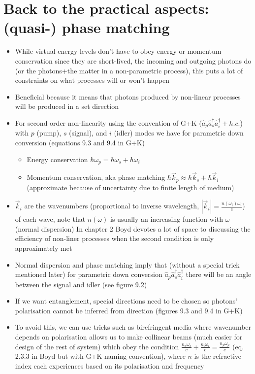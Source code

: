 \documentclass[english]{article}
\begin{document}
\section{Back to the practical aspects: (quasi-) phase matching}
\begin{itemize}
\item While virtual energy levels don't have to obey energy or momentum conservation since they are short-lived, the incoming and outgoing photons do (or the photons+the matter in a non-parametric process), this puts a lot of constraints on what processes will or won't happen
\item Beneficial because it means that photons produced by non-linear processes will be produced in a set direction
\item For second order non-linearity using the convention of G+K ($\hat{a}_p\hat{a}^\dagger_s\hat{a}^\dagger_i+h.c.$) with $p$ (pump), $s$ (signal), and $i$ (idler) modes we have for parametric down conversion (equations 9.3 and 9.4 in G+K)
\begin{itemize}
\item Energy conservation $\hbar \omega_p=\hbar \omega_s+\hbar \omega_i$
\item Momentum conservation, aka phase matching $\hbar \vec{k}_p\approx \hbar \vec{k}_s+\hbar \vec{k}_i$ (approximate because of uncertainty due to finite length of medium)
\end{itemize}
\item  $\vec{k}_i$ are the wavenumbers (proportional to inverse wavelength, $|\vec{k}_i|=\frac{n(\omega_i)\omega_i}{c}$) of each wave, note that $n(\omega)$ is usually an increasing function with $\omega$  (normal dispersion) In chapter 2 Boyd devotes a lot of space to discussing the efficiency of non-liner processes when the second condition is only approximately met
\item Normal dispersion and phase matching imply that (without a special trick mentioned later) for parametric down conversion $\hat{a}_p\hat{a}_s^\dagger\hat{a}_i^\dagger$ there will be an angle between the signal and idler (see figure 9.2)
\item If we want entanglement, special directions need to be chosen so photons' polarisation cannot be inferred from direction (figures 9.3 and 9.4 in G+K)
\item To avoid this, we can use tricks such as birefringent media where wavenumber depends on polarisation allows us to make collinear beams (much easier for design of the rest of system) which obey the condition  $\frac{n_s\omega_s}{c}+\frac{n_i\omega_i}{c}=\frac{n_p\omega_p}{c}$ (eq. 2.3.3 in Boyd but with G+K naming convention), where $n$ is the refractive index each experiences based on its polarisation and frequency

\end{itemize}
\end{document}
